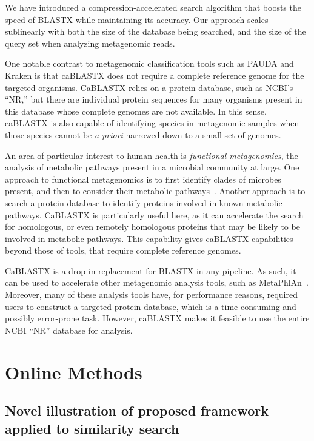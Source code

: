 \documentclass{amsbook}
\theoremstyle{definition}
\theoremstyle{remark}
\numberwithin{equation}{section}
\begin{document}
We have introduced a compression-accelerated search algorithm that boosts the
speed of BLASTX while maintaining its accuracy.
Our approach scales sublinearly with both the size of the database being
searched, and the size of the query set when analyzing metagenomic reads.

One notable contrast to metagenomic classification tools such as PAUDA and
Kraken is that caBLASTX does not require a complete reference genome for the
targeted organisms.
CaBLASTX relies on a protein database, such as NCBI's ``NR,'' but there are
individual protein sequences for many organisms present in this database whose
complete genomes are not available.
In this sense, caBLASTX is also capable of identifying species in metagenomic
samples when those species cannot be \emph{a priori} narrowed down to a small
set of genomes.

An area of particular interest to human health is \emph{functional 
metagenomics}, the analysis of metabolic pathways present in a microbial
community at large.
One approach to functional metagenomics is to first identify clades of
microbes present, and then to consider their metabolic pathways~\cite{blah}.
Another approach is to search a protein database to identify proteins involved
in known metabolic pathways.
CaBLASTX is particularly useful here, as it can accelerate the search for
homologous, or even remotely homologous proteins that may be likely to be
involved in metabolic pathways.
This capability gives caBLASTX capabilities beyond those of tools, that require
complete reference genomes.

CaBLASTX is a drop-in replacement for BLASTX in any pipeline.
As such, it can be used to accelerate other metagenomic analysis tools, such
as MetaPhlAn~\cite{blah}.
Moreover, many of these analysis tools have, for performance reasons, required
users to construct a targeted protein database, which is a time-consuming and
possibly error-prone task.
However, caBLASTX makes it feasible to use the entire NCBI ``NR'' database for
analysis.

\chapter{Online Methods}

\section{Novel illustration of proposed framework applied to similarity search}
\end{document}
